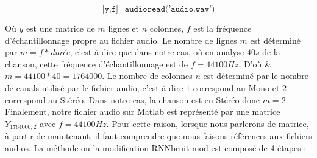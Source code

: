\documentclass[conference,onecolumn]{IEEEtran}
\begin{document}
\[ \texttt{[y,f]=audioread('audio.wav')}\]

Où $y$ est une matrice de $m$ lignes et $n$ colonnes, $f$ est la fréquence d’échantillonnage propre au fichier audio. Le nombre de lignes $m$ est déterminé par $m=f*$\textit{durée}, c’est-à-dire que dans notre cas, où en analyse $40s$ de la chanson, cette fréquence d’échantillonnage est de $f=44100Hz$. D’où \& $m=44100*40=1764000$. Le nombre de colonnes $n$ est déterminé par le nombre de canals utilisé par le fichier audio, c’est-à-dire $1$ correspond au  Mono et $2$ correspond au Stéréo. Dans notre cas, la chanson est en Stéréo donc $m=2$. Finalement, notre fichier audio sur Matlab est représenté par une matrice $Y_{1764000,2}$ avec $f=44100Hz$. Pour cette raison, lorsque nous parlerons de matrice, à partir de maintenant, il faut comprendre que nous faisons références aux fichiers audios.
La méthode ou la modification RNNbruit mod est composé de 4 étapes :
\end{document}
